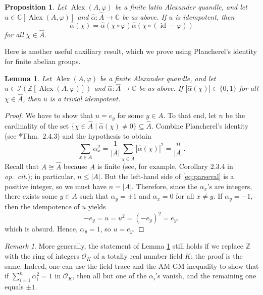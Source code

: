 \documentclass[12pt]{amsart}
\newtheorem{pro}[thm]{Proposition}
\newtheorem{lem}[thm]{Lemma}
\theoremstyle{definition}
\theoremstyle{remark}
\newtheorem{rmk}[thm]{Remark}
\newcommand{\Id}{\operatorname{id}}
\newcommand{\C}{\mathbb{C}}
\newcommand{\Z}{\mathbb{Z}}
\newcommand{\I}{\mathcal{I}}
\newcommand{\A}{\widehat{A}}
\newcommand{\Alpha}{\widehat{\alpha}}
\renewcommand{\phi}{\varphi}
\def\Alex{\operatorname{Alex}}
\begin{document}
\begin{pro}\label{prop:alex}
    Let $\Alex(A,\phi)$ be a finite latin Alexander quandle, and let $u\in \C[\Alex(A,\phi)]$ and $\Alpha\colon \A\to\C$ be as above. If $u$ is idempotent, then
    \[
    \Alpha (\chi)=\Alpha (\chi\circ\phi)\Alpha (\chi\circ(\Id-\phi))
    \]
    for all $\chi\in\A$.
\end{pro}

Here is another useful auxiliary result, which we prove using Plancherel's identity for finite abelian groups.

\begin{lem}\label{lem:parseval}
    Let $\Alex(A,\phi)$ be a finite Alexander quandle, and let $u\in \I(\Z[\Alex(A,\phi)])$ and $\Alpha\colon \A\to\C$ be as above. If $|\Alpha(\chi)|\in\{0,1\}$ for all $\chi\in\A$, then $u$ is a trivial idempotent.
\end{lem}

\begin{proof}
    We have to show that $u=e_y$ for some $y\in A$. To that end, let $n$ be the cardinality of the set $\{\chi\in \A\mid \Alpha (\chi)\neq 0\}\subseteq \A$. Combine Plancherel's identity (see \cite{fourier}*{Thm.\ 2.4.3}) and the hypothesis to obtain
    \begin{equation}\label{eq:parseval}
        \sum_{x\in A}\alpha_x^2=\frac{1}{|A|}\sum_{\chi\in \A}|\Alpha (\chi)|^2=\frac{n}{|A|}.
    \end{equation}
    Recall that $A\cong\A$ because $A$ is finite (see, for example, Corollary 2.3.4 in \emph{op.\ cit.}); in particular, $n\leq |A|$. 
    But the left-hand side of \eqref{eq:parseval} is a positive integer, so we must have $n=|A|$. Therefore, since the $\alpha_x$'s are integers, there exists some $y\in A$ such that $\alpha_y=\pm 1$ and $\alpha_x=0$ for all $x\neq y$.
    If $\alpha_y=-1$, then the idempotence of $u$ yields
    \[
    -e_y=u=u^2=(-e_y)^2=e_y,
    \]
    which is absurd. Hence, $\alpha_y=1$, so $u=e_y$.
\end{proof}

\begin{rmk}
    More generally, the statement of Lemma \ref{lem:parseval} still holds if we replace $\Z$ with the ring of integers $\mathcal O_K$ of a totally real number field $K$; the proof is the same. Indeed, one can use the field trace and the AM-GM inequality to show that if $\sum^n_{i=1}\alpha^2_i=1$ in $\mathcal O_K$, then all but one of the $\alpha_i$'s vanish, and the remaining one equals $\pm 1$.
\end{rmk}
\end{document}
